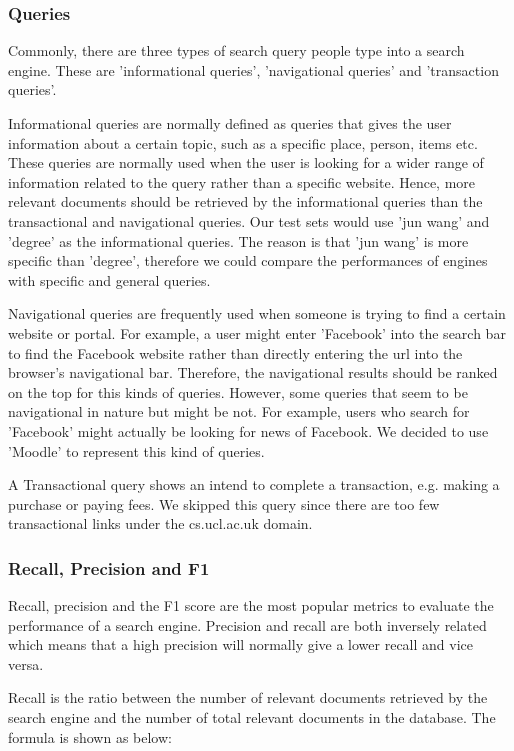 \subsubsection{Queries}
Commonly, there are three types of search query people type into a search engine. These are 'informational queries', 'navigational queries' and 'transaction queries'. 

Informational queries are normally defined as queries that gives the user information about a certain topic, such as a specific place, person, items etc. These queries are normally used when the user is looking for a wider range of information related to the query rather than a specific website. Hence, more relevant documents should be retrieved by the informational queries than the transactional and navigational queries. Our test sets would use 'jun wang' and 'degree' as the informational queries. The reason is that 'jun wang' is more specific than 'degree', therefore we could compare the performances of engines with specific and general queries.

Navigational queries are frequently used when someone is trying to find a certain website or portal. For example, a user might enter 'Facebook' into the search bar to find the Facebook website rather than directly entering the url into the browser's navigational bar. Therefore, the navigational results should be ranked on the top for this kinds of queries. However, some queries that seem to be navigational in nature but might be not. For example, users who search for 'Facebook' might actually be looking for news of Facebook. We decided to use 'Moodle' to represent this kind of queries.

A Transactional query shows an intend to complete a transaction, e.g. making a purchase or paying fees. We skipped this query since there are too few transactional links under the cs.ucl.ac.uk domain. 

\subsubsection{Recall, Precision and F1}
Recall, precision and the F1 score are the most popular metrics to evaluate the performance of a search engine. Precision and recall are both inversely related which means that a high precision will normally give a lower recall and vice versa.

Recall is the ratio between the number of relevant documents retrieved by the search engine and the number of total relevant documents in the database. The formula is shown as below: 

